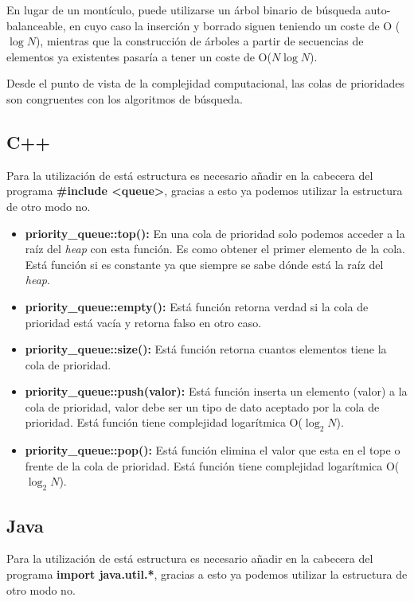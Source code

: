 En lugar de un montículo, puede utilizarse un árbol binario de búsqueda auto-balanceable, en cuyo caso la inserción y borrado siguen teniendo un coste de O ($\log N$), mientras que la construcción de árboles a partir de secuencias de elementos ya existentes pasaría a tener un coste de O($N\log N$).

Desde el punto de vista de la complejidad computacional, las colas de prioridades son congruentes con los algoritmos de búsqueda. 

\subsection{C++}

Para la utilización de está estructura es necesario añadir en la cabecera del programa \textbf{\#include
	<queue>}, gracias a esto ya podemos utilizar la estructura de otro modo no.

\begin{itemize}
	\item \textbf{priority\_queue::top():} En una cola de prioridad solo podemos acceder a la raíz del \emph{heap} con esta función. Es como obtener el primer elemento de la cola. Está función
	si es constante ya que siempre se sabe dónde está la raíz del \emph{heap}.
	\item \textbf{priority\_queue::empty():} Está función retorna verdad si la cola de prioridad está vacía y retorna falso en otro
	caso.
	\item \textbf{priority\_queue::size():} Está función retorna cuantos elementos tiene la cola de prioridad.
	\item \textbf{priority\_queue::push(valor):} Está función inserta un elemento (valor) a la cola de prioridad, valor debe ser un
	tipo de dato aceptado por la cola de prioridad. Está función tiene complejidad
	logarítmica O($\log_2 N$).
	\item \textbf{priority\_queue::pop():} Está función elimina el valor que esta en el tope o frente de la cola de prioridad. Está función tiene complejidad logarítmica O($\log_2 N$).
\end{itemize}

\subsection{Java}

Para la utilización de está estructura es necesario añadir en la cabecera del programa \textbf{import java.util.*}, gracias a esto ya podemos utilizar la estructura de otro modo no.

